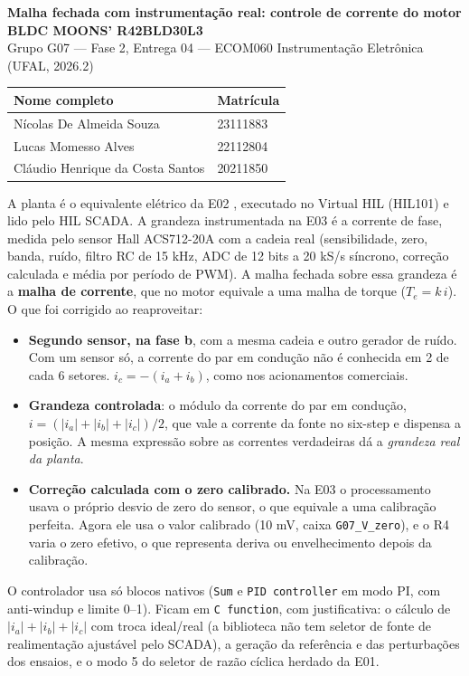 \documentclass[10pt,a4paper]{article}
\newcommand{\R}[1]{\FloatBarrier\par\medskip\noindent{\large\bfseries #1}\par\smallskip}
\begin{document}
\begin{center}
{\Large\bfseries Malha fechada com instrumentação real: controle de corrente do motor BLDC MOONS' R42BLD30L3}\\[2pt]
Grupo G07 — Fase 2, Entrega 04 — ECOM060 Instrumentação Eletrônica (UFAL, 2026.2)\\[4pt]
\begin{tabular}{ll}\toprule Nome completo & Matrícula\\\midrule
Nícolas De Almeida Souza & 23111883\\ Lucas Momesso Alves & 22112804\\ Cláudio Henrique da Costa Santos & 20211850\\\bottomrule\end{tabular}
\end{center}

\R{Ponto de partida}
A planta é o equivalente elétrico da E02 \cite{e02}, executado no Virtual HIL (HIL101) e lido pelo HIL SCADA. A grandeza instrumentada na E03 \cite{e03} é a corrente de fase, medida pelo sensor Hall ACS712-20A com a cadeia real (sensibilidade, zero, banda, ruído, filtro RC de 15 kHz, ADC de 12 bits a 20 kS/s síncrono, correção calculada e média por período de PWM). A malha fechada sobre essa grandeza é a \textbf{malha de corrente}, que no motor equivale a uma malha de torque ($T_e = k\,i$). O que foi corrigido ao reaproveitar:
\begin{itemize}
\item \textbf{Segundo sensor, na fase b}, com a mesma cadeia e outro gerador de ruído. Com um sensor só, a corrente do par em condução não é conhecida em 2 de cada 6 setores. $i_c = -(i_a+i_b)$, como nos acionamentos comerciais.
\item \textbf{Grandeza controlada}: o módulo da corrente do par em condução, $i = (|i_a|+|i_b|+|i_c|)/2$, que vale a corrente da fonte no six-step e dispensa a posição. A mesma expressão sobre as correntes verdadeiras dá a \emph{grandeza real da planta}.
\item \textbf{Correção calculada com o zero calibrado.} Na E03 o processamento usava o próprio desvio de zero do sensor, o que equivale a uma calibração perfeita. Agora ele usa o valor calibrado (10 mV, caixa \texttt{G07\_V\_zero}), e o R4 varia o zero efetivo, o que representa deriva ou envelhecimento depois da calibração.
\end{itemize}
O controlador usa só blocos nativos (\texttt{Sum} e \texttt{PID controller} em modo PI, com anti-windup e limite 0–1). Ficam em \texttt{C function}, com justificativa: o cálculo de $|i_a|+|i_b|+|i_c|$ com troca ideal/real (a biblioteca não tem seletor de fonte de realimentação ajustável pelo SCADA), a geração da referência e das perturbações dos ensaios, e o modo 5 do seletor de razão cíclica herdado da E01.
\end{document}
